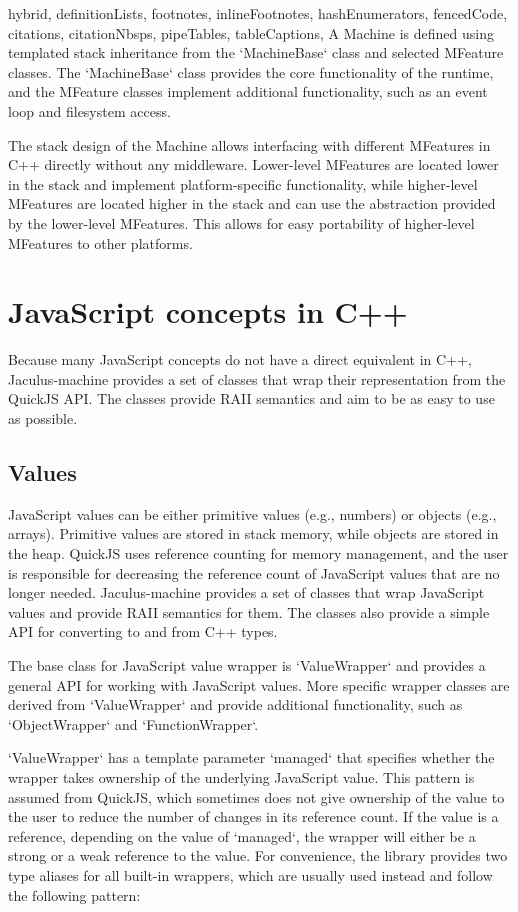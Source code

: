 \begin{markdown*}{%
  hybrid,
  definitionLists,
  footnotes,
  inlineFootnotes,
  hashEnumerators,
  fencedCode,
  citations,
  citationNbsps,
  pipeTables,
  tableCaptions,
}
A Machine is defined using templated stack inheritance from the `MachineBase` class and selected MFeature classes. The `MachineBase` class provides the core functionality of the runtime, and the MFeature classes implement additional functionality, such as an event loop and filesystem access.

The stack design of the Machine allows interfacing with different MFeatures in C++ directly without any middleware. Lower-level MFeatures are located lower in the stack and implement platform-specific functionality, while higher-level MFeatures are located higher in the stack and can use the abstraction provided by the lower-level MFeatures. This allows for easy portability of higher-level MFeatures to other platforms.


\section{JavaScript concepts in C++}

Because many JavaScript concepts do not have a direct equivalent in C++, Jaculus-machine provides a set of classes that wrap their representation from the QuickJS API. The classes provide RAII semantics and aim to be as easy to use as possible.

\subsection{Values}

JavaScript values can be either primitive values (e.g., numbers) or objects (e.g., arrays). Primitive values are stored in stack memory, while objects are stored in the heap. QuickJS uses reference counting for memory management, and the user is responsible for decreasing the reference count of JavaScript values that are no longer needed. Jaculus-machine provides a set of classes that wrap JavaScript values and provide RAII semantics for them. The classes also provide a simple API for converting to and from C++ types.

The base class for JavaScript value wrapper is `ValueWrapper` and provides a general API for working with JavaScript values. More specific wrapper classes are derived from `ValueWrapper` and provide additional functionality, such as `ObjectWrapper` and `FunctionWrapper`.

`ValueWrapper` has a template parameter `managed` that specifies whether the wrapper takes ownership of the underlying JavaScript value. This pattern is assumed from QuickJS, which sometimes does not give ownership of the value to the user to reduce the number of changes in its reference count. If the value is a reference, depending on the value of `managed`, the wrapper will either be a strong or a weak reference to the value. For convenience, the library provides two type aliases for all built-in wrappers, which are usually used instead and follow the following pattern:


\end{markdown*}
